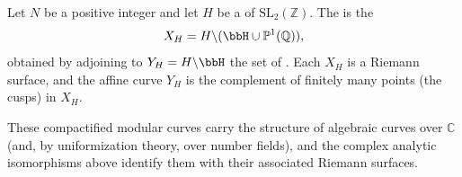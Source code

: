 \begin{definition} \label{definition:classical_compactified_modular_curve_associated_to_a_congruence_subgroup_of_SL_2_Z}
Let $N$ be a positive integer and let $H$ be a  of $\mathrm{SL}_2(\mathbb{Z})$. The  is the 
\[
    X_H = H \backslash (\bbH \cup \mathbb{P}^1(\mathbb{Q})),
\]
obtained by adjoining to $Y_H = H \backslash \bbH$ the set of . Each $X_H$ is a  Riemann surface, and the affine curve $Y_H$ is the complement of finitely many points (the cusps) in $X_H$.


These compactified modular curves carry the structure of algebraic curves over $\mathbb{C}$ (and, by uniformization theory, over number fields), and the complex analytic isomorphisms above identify them with their associated Riemann surfaces.
\end{definition}
